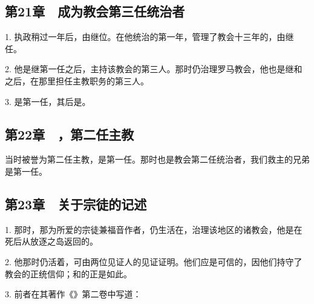 \subsection{第21章　成为教会第三任统治者}

1. 执政稍过一年后，由继位。在他统治的第一年，管理了教会十三年的，由继任。\par

2. 他是继第一任之后，主持该教会的第三人。那时仍治理罗马教会，他也是继和之后，在那里担任主教职务的第三人。\par

3. 是第一任，其后是。\par


\subsection{第22章　，第二任主教}

当时被誉为第二任主教，是第一任。那时也是教会第二任统治者，我们救主的兄弟是第一任。\par


\subsection{第23章　关于宗徒的记述}

1. 那时，那为所爱的宗徒兼福音作者，仍生活在，治理该地区的诸教会，他是在死后从放逐之岛返回的。\par

2. 他那时仍活着，可由两位见证人的见证证明。他们应是可信的，因他们持守了教会的正统信仰；和的正是如此。\par

3. 前者在其著作《》第二卷中写道：\par

